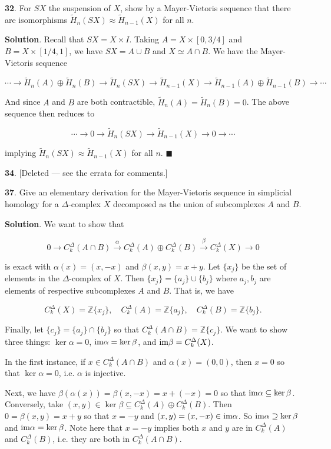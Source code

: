 \documentclass{article}
\newcommand{\Z}{\mathbb{Z}}
\newcommand{\im}{\textnormal{im}}
\begin{document}
\textbf{32}. For $SX$ the suspension of $X$, show by a Mayer-Vietoris sequence that there are isomorphisms $\tilde{H}_{n}(SX)\approx \tilde{H}_{n-1}(X)$ for all $n$.
\medskip

\textbf{Solution}. Recall that $SX = X\times I$. Taking $A = X\times [0, 3/4]$ and $B = X\times [1/4, 1]$, we have $SX = A\cup B$ and $X\simeq A\cap B$. We have the Mayer-Vietoris sequence

$$\cdots \to \tilde{H}_{n}(A)\oplus \tilde{H}_{n}(B)\to \tilde{H}_{n}(SX)\to \tilde{H}_{n-1}(X)\to \tilde{H}_{n-1}(A)\oplus \tilde{H}_{n-1}(B)\to \cdots$$

And since $A$ and $B$ are both contractible, $\tilde{H}_{n}(A) = \tilde{H}_{n}(B) = 0$. The above sequence then reduces to

$$\cdots \to 0\to \tilde{H}_{n}(SX)\to \tilde{H}_{n-1}(X)\to 0\to \cdots$$

implying $\tilde{H}_{n}(SX)\approx \tilde{H}_{n-1}(X)$ for all $n$. $\blacksquare$
\bigskip
\bigskip

\textbf{34}. [Deleted — see the errata for comments.]
\bigskip
\bigskip

\textbf{37}. Give an elementary derivation for the Mayer-Vietoris sequence in simplicial homology for a $\Delta$-complex $X$ decomposed as the union of subcomplexes $A$ and $B$.
\medskip

\textbf{Solution}. We want to show that

$$0\to C_{k}^{\Delta}(A\cap B)\xrightarrow{\alpha} C_{k}^{\Delta}(A)\oplus C_{k}^{\Delta}(B)\xrightarrow{\beta} C_{k}^{\Delta}(X)\to 0$$

is exact with $\alpha(x) = (x, -x)$ and $\beta(x, y) = x + y$. Let $\{x_{j}\}$ be the set of elements in the $\Delta$-complex of $X$. Then $\{x_{j}\} = \{a_{j}\}\cup \{b_{j}\}$
where $a_{j}, b_{j}$ are elements of respective subcomplexes $A$ and $B$. That is, we have

$$C_{k}^{\Delta}(X) = \Z \{x_{j}\},\quad C_{k}^{\Delta}(A) = \Z \{a_{j}\},\quad C_{k}^{\Delta}(B) = \Z \{b_{j}\}.$$

Finally, let $\{c_{j}\} = \{a_{j}\}\cap \{b_{j}\}$ so that $C_{k}^{\Delta}(A\cap B) = \Z \{c_{j}\}$. We want to show three things: $\ker \alpha = 0$, $\im \alpha = \ker \beta$, and $\im \beta = C_{k}^{\Delta}(X)$.
\medskip

In the first instance, if $x\in C_{k}^{\Delta}(A\cap B)$ and $\alpha(x) = (0, 0)$, then $x = 0$ so that $\ker \alpha = 0$, i.e. $\alpha$ is injective.
\medskip

Next, we have $\beta(\alpha(x)) = \beta(x, -x) = x + (-x) = 0$ so that $\im \alpha\subseteq \ker \beta$. Conversely, take $(x, y)\in \ker \beta\subseteq C_{k}^{\Delta}(A)\oplus C_{k}^{\Delta}(B)$. Then $0 = \beta(x, y) = x + y$ so that $x = -y$ and $(x, y) = (x, -x)\in \im \alpha$. So $\im \alpha\supseteq \ker \beta$ and $\im \alpha = \ker \beta$. Note here that $x = -y$ implies both $x$ and $y$ are in $C_{k}^{\Delta}(A)$ and $C_{k}^{\Delta}(B)$, i.e. they are both in $C_{k}^{\Delta}(A\cap B)$.
\medskip
\end{document}
